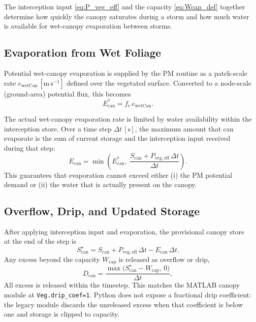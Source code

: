 \documentclass[12pt]{article}
\begin{document}
The interception input \eqref{eq:P_veg_eff} and the capacity \eqref{eq:Wcap_def} together determine how quickly the canopy saturates during a storm and how much water is available for wet-canopy evaporation between storms.

\subsection{Evaporation from Wet Foliage}

Potential wet-canopy evaporation is supplied by the PM routine as a patch-scale rate \(e_{\mathrm{wetCan}}\,[\mathrm{m\,s^{-1}}]\) defined over the vegetated surface.
Converted to a node-scale (ground-area) potential flux, this becomes
\begin{equation}
E_{\mathrm{can}}^{\ast} = f_v\, e_{\mathrm{wetCan}}.
\label{eq:Ecan_potential}
\end{equation}

The actual wet-canopy evaporation rate is limited by water availability within the interception store.
Over a time step \(\Delta t\,[\mathrm{s}]\), the maximum amount that can evaporate is the sum of current storage and the interception input received during that step:
\begin{equation}
E_{\mathrm{can}} = \min\!\left(E_{\mathrm{can}}^{\ast},\;
\frac{S_{\mathrm{can}} + P_{\mathrm{veg,eff}}\,\Delta t}{\Delta t}\right).
\label{eq:Ecan_actual}
\end{equation}
This guarantees that evaporation cannot exceed either (i) the PM potential demand or (ii) the water that is actually present on the canopy.

\subsection{Overflow, Drip, and Updated Storage}

After applying interception input and evaporation, the provisional canopy store at the end of the step is
\begin{equation}
S_{\mathrm{can}}^{\star} = S_{\mathrm{can}} + P_{\mathrm{veg,eff}}\,\Delta t - E_{\mathrm{can}}\,\Delta t.
\label{eq:Scan_star}
\end{equation}
Any excess beyond the capacity \(W_{\mathrm{cap}}\) is released as overflow or drip,
\begin{equation}
D_{\mathrm{can}} =
\frac{\max\bigl(S_{\mathrm{can}}^{\star} - W_{\mathrm{cap}},\,0\bigr)}{\Delta t},
\label{eq:Dcan_def}
\end{equation}
All excess is released within the timestep. This matches the MATLAB canopy module at \texttt{Veg.drip\_coef=1}. Python does not expose a fractional drip coefficient: the legacy module discards the unreleased excess when that coefficient is below one and storage is clipped to capacity.
\end{document}
